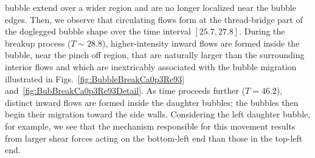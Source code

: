 \documentclass{elsarticle}
\begin{document}
bubble extend over a wider region and are no longer localized near the bubble
edges.  Then, we observe that circulating flows form at the thread-bridge part
of the doglegged bubble shape over the time interval $[25.7, 27.8]$.  During
the breakup process ($T \sim 28.8$), higher-intensity inward flows are formed
inside the bubble, near the pinch off region, that are naturally larger than
the surrounding interior flows and which are inextricably associated with the
bubble migration illustrated in Figs.~\ref{fig:BubbleBreakCa0p3Re93}
and~\ref{fig:BubBreakCa0p3Re93Detail}.  As time proceeds further ($T =  46.2$),
distinct inward flows are formed inside the daughter bubbles; the bubbles then
begin their migration toward the side walls.  Considering the left daughter
bubble, for example, we see that the mechanism responsible for this movement
results from larger shear forces acting on the bottom-left end than those in
the top-left end.
\end{document}
